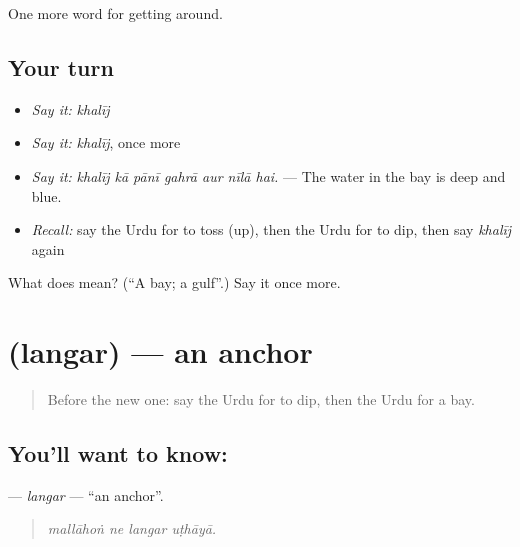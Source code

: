\begin{grammarlens}[title={What you've built}]
One more word for getting around.
\end{grammarlens}

\subsection*{Your turn}
\begin{itemize}
\raggedright
  \item \emph{Say it:} \emph{khalīj}
  \item \emph{Say it:} \emph{khalīj}, once more
  \item \emph{Say it:} \emph{khalīj kā pānī gahrā aur nīlā hai.} — The water in the bay is deep and blue.
  \item \emph{Recall:} say the Urdu for to toss (up), then the Urdu for to dip, then say \emph{khalīj} again
\end{itemize}

\begin{tcolorbox}[breakable,colback=teal!4,colframe=teal!35!black,title={Before you move on}]
What does  mean? (\textquotedblleft{}A bay; a gulf\textquotedblright{}.) Say it once more.
\end{tcolorbox}
\section[\texorpdfstring{\ur{لنگر} (langar)}{لنگر (langar)}]{ (langar) — an anchor}

\label{lesson:UR-C435-langar}



\begin{quote}
Before the new one: say the Urdu for to dip, then the Urdu for a bay.
\end{quote}

\subsection*{You'll want to know: }
\textbf{} — \emph{langar} — \textquotedblleft{}an anchor\textquotedblright{}.

\begin{quote}
   
\end{quote}

\begin{quote}
\emph{mallāhoṅ ne langar uṭhāyā.}
\end{quote}

